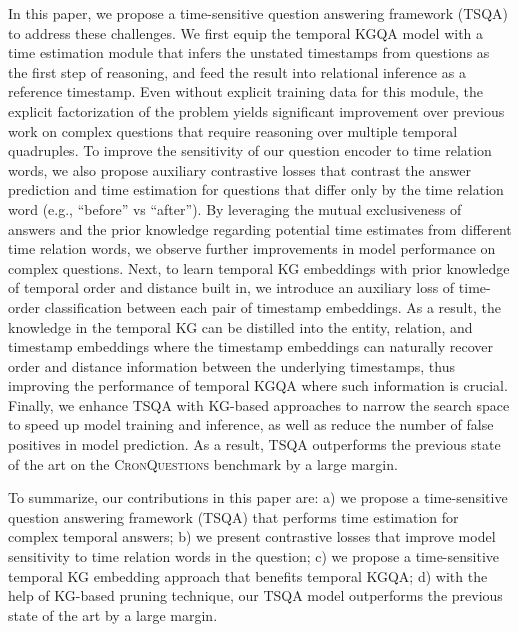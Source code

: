 \documentclass[11pt]{article}
\begin{document}
In this paper, we propose a time-sensitive question answering framework (TSQA) to address these challenges.
We first equip the temporal KGQA model with a time estimation module that infers the unstated timestamps from questions as the first step of reasoning, and feed the result into relational inference as a reference timestamp.
Even without explicit training data for this module, the explicit factorization of the problem yields significant improvement over previous work on complex questions that require reasoning over multiple temporal quadruples.
To improve the sensitivity of our question encoder to time relation words, we also propose auxiliary contrastive losses that contrast the answer prediction and time estimation for questions that differ only by the time relation word (e.g., ``before'' vs ``after'').
By leveraging the mutual exclusiveness of answers and the prior knowledge regarding potential time estimates from different time relation words, we observe further improvements in model performance on complex questions.
Next, to learn temporal KG embeddings with prior knowledge of temporal order and distance built in, we introduce an auxiliary loss of time-order classification between each pair of timestamp embeddings.
As a result, the knowledge in the temporal KG can be distilled into the entity, relation, and timestamp embeddings where the timestamp embeddings can naturally recover order and distance information between the underlying timestamps, thus improving the performance of temporal KGQA where such information is crucial.
Finally, we enhance TSQA with KG-based approaches to narrow the search space to speed up model training and inference, as well as reduce the number of false positives in model prediction.
As a result, TSQA outperforms the previous state of the art on the \textsc{CronQuestions} benchmark \citep{saxena2021question} by a large margin.

To summarize, our contributions in this paper are: a) we propose a time-sensitive question answering framework (TSQA) that performs time estimation for complex temporal answers; b) we present contrastive losses that improve model sensitivity to time relation words in the question; c) we propose a time-sensitive temporal KG embedding approach that benefits temporal KGQA; d) with the help of KG-based pruning technique, our TSQA model outperforms the previous state of the art by a large margin.
\end{document}
